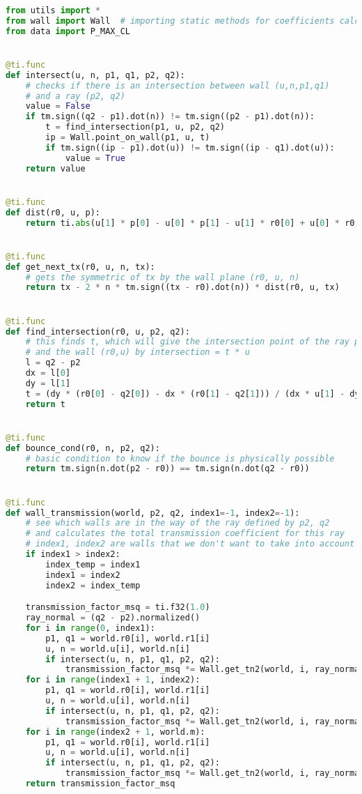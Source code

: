 \begin{lstlisting}[language=python]
from utils import *
from wall import Wall  # importing static methods for coefficients calculation
from data import P_MAX_CL


@ti.func
def intersect(u, n, p1, q1, p2, q2):
    # checks if there is an intersection between wall (u,n,p1,q1)
    # and a ray (p2, q2)
    value = False
    if tm.sign((q2 - p1).dot(n)) != tm.sign((p2 - p1).dot(n)):
        t = find_intersection(p1, u, p2, q2)
        ip = Wall.point_on_wall(p1, u, t)
        if tm.sign((ip - p1).dot(u)) != tm.sign((ip - q1).dot(u)):
            value = True
    return value


@ti.func
def dist(r0, u, p):
    return ti.abs(u[1] * p[0] - u[0] * p[1] - u[1] * r0[0] + u[0] * r0[1])


@ti.func
def get_next_tx(r0, u, n, tx):
    # gets the symmetric of tx by the wall plane (r0, u, n)
    return tx - 2 * n * tm.sign((tx - r0).dot(n)) * dist(r0, u, tx)


@ti.func
def find_intersection(r0, u, p2, q2):
    # this finds t, which will give the intersection point of the ray p2,q2
    # and the wall (r0,u) by intersection = t * u
    l = q2 - p2
    dx = l[0]
    dy = l[1]
    t = (dy * (r0[0] - q2[0]) - dx * (r0[1] - q2[1])) / (dx * u[1] - dy * u[0])
    return t


@ti.func
def bounce_cond(r0, n, p2, q2):
    # basic condition to know if the bounce is physically possible
    return tm.sign(n.dot(p2 - r0)) == tm.sign(n.dot(q2 - r0))


@ti.func
def wall_transmission(world, p2, q2, index1=-1, index2=-1):
    # see which walls are in the way of the ray defined by p2, q2
    # and calculates the total transmission coefficient for this ray
    # index1, index2 are walls that we don't want to take into account
    if index1 > index2:
        index_temp = index1
        index1 = index2
        index2 = index_temp

    transmission_factor_msq = ti.f32(1.0)
    ray_normal = (q2 - p2).normalized()
    for i in range(0, index1):
        p1, q1 = world.r0[i], world.r1[i]
        u, n = world.u[i], world.n[i]
        if intersect(u, n, p1, q1, p2, q2):
            transmission_factor_msq *= Wall.get_tn2(world, i, ray_normal)
    for i in range(index1 + 1, index2):
        p1, q1 = world.r0[i], world.r1[i]
        u, n = world.u[i], world.n[i]
        if intersect(u, n, p1, q1, p2, q2):
            transmission_factor_msq *= Wall.get_tn2(world, i, ray_normal)
    for i in range(index2 + 1, world.m):
        p1, q1 = world.r0[i], world.r1[i]
        u, n = world.u[i], world.n[i]
        if intersect(u, n, p1, q1, p2, q2):
            transmission_factor_msq *= Wall.get_tn2(world, i, ray_normal)
    return transmission_factor_msq



\end{lstlisting}
